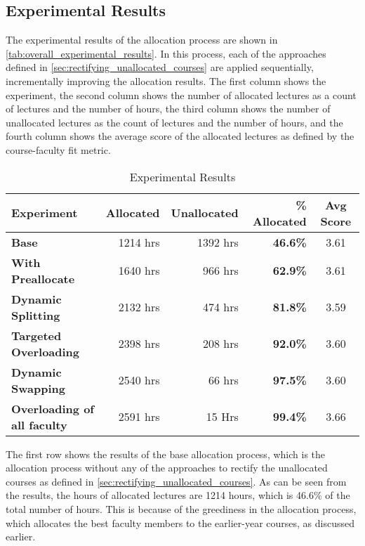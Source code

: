 \subsection{Experimental Results}

The experimental results of the allocation process are shown in \autoref{tab:overall_experimental_results}. In this process, each of the approaches defined in \autoref{sec:rectifying_unallocated_courses} are applied sequentially, incrementally improving the allocation results. The first column shows the experiment, the second column shows the number of allocated lectures as a count of lectures and the number of hours, the third column shows the number of unallocated lectures as the count of lectures and the number of hours, and the fourth column shows the average score of the allocated lectures as defined by the course-faculty fit metric.

\begin{table}[H]
  \centering
  \begin{tabular}{|l|r|r|r|c|}
    \hline
    \textbf{Experiment}                 & \textbf{Allocated} & \textbf{Unallocated} & \textbf{\% Allocated} & \textbf{Avg Score} \\ \hline
    \textbf{Base}                       & 1214 hrs           & 1392 hrs             & \textbf{46.6\%}       & 3.61               \\ \hline
    \textbf{With Preallocate}           & 1640 hrs           & 966 hrs              & \textbf{62.9\%}       & 3.61               \\ \hline
    \textbf{Dynamic Splitting}          & 2132 hrs           & 474 hrs              & \textbf{81.8\%}       & 3.59               \\ \hline
    \textbf{Targeted Overloading}       & 2398 hrs           & 208 hrs              & \textbf{92.0\%}       & 3.60               \\ \hline
    \textbf{Dynamic Swapping}           & 2540 hrs           & 66 hrs               & \textbf{97.5\%}       & 3.60               \\ \hline
    \textbf{Overloading of all faculty} & 2591 hrs           & 15 Hrs               & \textbf{99.4\%}       & 3.66               \\ \hline
  \end{tabular}
  \caption{Experimental Results}
  \label{tab:overall_experimental_results}
\end{table}

The first row shows the results of the base allocation process, which is the allocation process without any of the approaches to rectify the unallocated courses as defined in  \autoref{sec:rectifying_unallocated_courses}. As can be seen from the results, the hours of allocated lectures are 1214 hours, which is 46.6\% of the total number of hours. This is because of the greediness in the allocation process, which allocates the best faculty members to the earlier-year courses, as discussed earlier.


